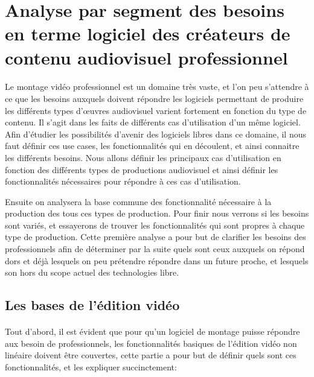 \newpage

\section{Analyse par segment des besoins en terme logiciel des créateurs de contenu
audiovisuel professionnel}

\paragraph{}
Le montage vidéo professionnel est un domaine très vaste, et l'on peu
s'attendre à ce que les besoins auxquels doivent répondre les logiciels
permettant de produire les différents types d'œuvres audiovisuel
varient fortement en fonction du type de contenu. Il s'agit dans les faits
de différents cas d'utilisation d'un même logiciel. Afin d'étudier
les possibilités d'avenir des logiciels libres dans ce domaine, il nous faut
définir ces use cases, les fonctionnalités qui en découlent, et ainsi connaitre
les différents besoins. Nous allons définir les principaux cas d'utilisation en fonction des
différents types de productions audiovisuel et ainsi définir les fonctionnalités
nécessaires pour répondre à ces cas d'utilisation.

Ensuite on analysera la base commune des fonctionnalité nécessaire à la
production des tous ces types de production.  Pour finir
nous verrons si les besoins sont variés, et essayerons de trouver les
fonctionnalités qui sont propres à chaque type de production. Cette première
analyse a pour but de clarifier les besoins des professionnels afin de
déterminer par la suite quels sont ceux auxquels on répond dors et déjà
lesquels on peu prétendre répondre dans un future proche, et lesquels
son hors du scope actuel des technologies libre.

\subsection{Les bases de l'édition vidéo}
\paragraph{}
Tout d'abord, il est évident que pour qu'un logiciel de montage puisse répondre
aux besoin de professionnels, les fonctionnalités basiques de l'édition vidéo
non linéaire doivent être couvertes, cette partie a pour but de définir quels sont ces
fonctionnalités, et les expliquer succinctement:

